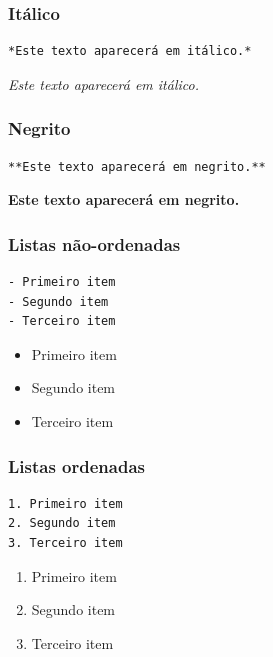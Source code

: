 \documentclass[10pt,a4paper]{book}
\providecommand{\tightlist}{%
  \setlength{\itemsep}{0pt}\setlength{\parskip}{0pt}}
\begin{document}
\subsubsection*{Itálico}\label{italico}


\begin{verbatim}
*Este texto aparecerá em itálico.*
\end{verbatim}

\emph{Este texto aparecerá em itálico.}

\subsubsection*{Negrito}\label{negrito}


\begin{verbatim}
**Este texto aparecerá em negrito.**
\end{verbatim}

\textbf{Este texto aparecerá em negrito.}

\subsubsection*{Listas não-ordenadas}\label{listas-nao-ordenadas}


\begin{verbatim}
- Primeiro item
- Segundo item
- Terceiro item
\end{verbatim}

\begin{itemize}
\tightlist
\item
  Primeiro item
\item
  Segundo item
\item
  Terceiro item
\end{itemize}

\subsubsection*{Listas ordenadas}\label{listas-ordenadas}


\begin{verbatim}
1. Primeiro item
2. Segundo item
3. Terceiro item
\end{verbatim}

\begin{enumerate}
\def\labelenumi{\arabic{enumi}.}
\tightlist
\item
  Primeiro item
\item
  Segundo item
\item
  Terceiro item
\end{enumerate}
\end{document}
